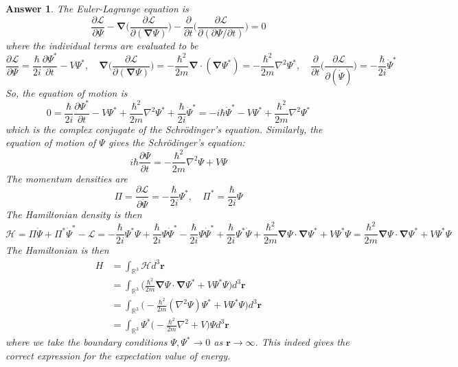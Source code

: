 \documentclass[a4paper]{article}
\newtheorem{ans}{Answer}[section]
\theoremstyle{new}
\begin{document}
\begin{ans}
The Euler-Lagrange equation is
$$\frac{\partial\mathcal{L}}{\partial\Psi}-\boldsymbol{\nabla}\bigg(\frac{\partial\mathcal{L}}{\partial(\boldsymbol{\nabla}\Psi)}\bigg)-\frac{\partial}{\partial t}\bigg(\frac{\partial\mathcal{L}}{\partial(\partial\Psi/\partial t)}\bigg)=0$$
where the individual terms are evaluated to be
$$\frac{\partial\mathcal{L}}{\partial\Psi}=\frac{\hbar}{2i}\frac{\partial\Psi^*}{\partial t}-V\Psi^*,\quad\boldsymbol{\nabla}\bigg(\frac{\partial\mathcal{L}}{\partial(\boldsymbol{\nabla}\Psi)}\bigg)=-\frac{\hbar^2}{2m}\boldsymbol{\nabla}\cdot(\boldsymbol{\nabla}\Psi^*)=-\frac{\hbar^2}{2m}\nabla^2\Psi^*,\quad\frac{\partial}{\partial t}\bigg(\frac{\partial\mathcal{L}}{\partial(\dot{\Psi})}\bigg)=-\frac{\hbar}{2i}\dot{\Psi}^*$$
So, the equation of motion is
$$0=\frac{\hbar}{2i}\frac{\partial\Psi^*}{\partial t}-V\Psi^*+\frac{\hbar^2}{2m}\nabla^2\Psi^*+\frac{\hbar}{2i}\dot{\Psi}^*=-i\hbar\dot{\Psi}^*-V\Psi^*+\frac{\hbar^2}{2m}\nabla^2\Psi^*$$
which is the complex conjugate of the Schr\"{o}dinger's equation. Similarly, the equation of motion of $\Psi$ gives the Schr\"{o}dinger's equation:
$$i\hbar\frac{\partial\Psi}{\partial t}=-\frac{\hbar^2}{2m}\nabla^2\Psi+V\Psi$$
The momentum densities are
$$\Pi=\frac{\partial\mathcal{L}}{\partial\dot{\Psi}}=-\frac{\hbar}{2i}\Psi^*,\quad\Pi^*=\frac{\hbar}{2i}\Psi$$
The Hamiltonian density is then
$$\mathcal{H}=\Pi\dot{\Psi}+\Pi^*\dot{\Psi}^*-\mathcal{L}=-\frac{\hbar}{2i}\Psi^*\Psi+\frac{\hbar}{2i}\Psi\dot{\Psi}^*-\frac{\hbar}{2i}\Psi\dot{\Psi}^*+\frac{\hbar}{2i}\Psi^*\dot{\Psi}+\frac{\hbar^2}{2m}\boldsymbol{\nabla}\Psi\cdot\boldsymbol{\nabla}\Psi^*+V\Psi^*\Psi=\frac{\hbar^2}{2m}\boldsymbol{\nabla}\Psi\cdot\boldsymbol{\nabla}\Psi^*+V\Psi^*\Psi$$
The Hamiltonian is then
\begin{align}
    H&=\int_{\mathbb{R}^3}\mathcal{H}d^3\mathbf{r}\nonumber\\&=\int_{\mathbb{R}^3}\bigg(\frac{\hbar^2}{2m}\boldsymbol{\nabla}\Psi\cdot\boldsymbol{\nabla}\Psi^*+V\Psi^*\Psi\bigg)d^3\mathbf{r}\nonumber\\&=\int_{\mathbb{R}^3}\bigg(-\frac{\hbar^2}{2m}(\nabla^2\Psi)\Psi^*+V\Psi^*\Psi\bigg)d^3\mathbf{r}\nonumber\\&=\int_{\mathbb{R}^3}\Psi^*\bigg(-\frac{\hbar^2}{2m}\nabla^2+V\bigg)\Psi d^3\mathbf{r}\nonumber
\end{align}
where we take the boundary conditions $\Psi,\Psi^*\rightarrow 0$ as $\mathbf{r}\rightarrow\infty$. This indeed gives the correct expression for the expectation value of energy.
\end{ans}
\newpage
\end{document}
